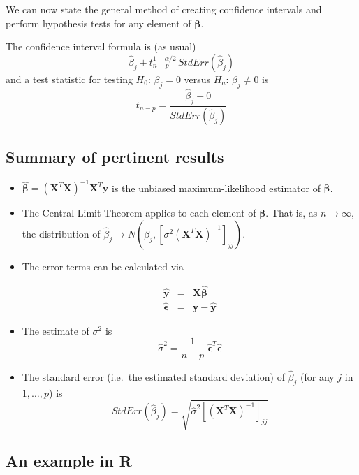 \documentclass[]{book}
\theoremstyle{definition}
\theoremstyle{definition}
\theoremstyle{remark}
\begin{document}
We can now state the general method of creating confidence intervals and
perform hypothesis tests for any element of \(\boldsymbol{\beta}\).

The confidence interval formula is (as usual) \[
\hat{\beta}_{j}\pm t_{n-p}^{1-\alpha/2}\,StdErr\left(\hat{\beta}_{j}\right)
\] and a test statistic for testing \(H_{0}:\,\beta_{j}=0\) versus
\(H_{a}:\,\beta_{j}\ne0\) is \[
t_{n-p}=\frac{\hat{\beta}_{j}-0}{StdErr\left(\hat{\beta}_{j}\right)}
\]

\subsection{Summary of pertinent
results}\label{summary-of-pertinent-results}

\begin{itemize}
\item
  \(\hat{\boldsymbol{\beta}}=\left(\boldsymbol{X}^{T}\boldsymbol{X}\right)^{-1}\boldsymbol{X}^{T}\boldsymbol{y}\)
  is the unbiased maximum-likelihood estimator of
  \(\boldsymbol{\beta}\).
\item
  The Central Limit Theorem applies to each element of
  \(\boldsymbol{\beta}\). That is, as \(n\to\infty\), the distribution
  of
  \(\hat{\beta}_{j}\to N\left(\beta_{j},\left[\sigma^{2}\left(\boldsymbol{X}^{T}\boldsymbol{X}\right)^{-1}\right]_{jj}\right)\).
\item
  The error terms can be calculated via

  \begin{eqnarray*}
  \hat{\boldsymbol{y}} & = & \boldsymbol{X}\hat{\boldsymbol{\beta}}\\
  \hat{\boldsymbol{\epsilon}} & = & \boldsymbol{y}-\hat{\boldsymbol{y}}
  \end{eqnarray*}
\item
  The estimate of \(\sigma^{2}\) is \[
  \hat{\sigma}^{2}=\frac{1}{n-p}\;\hat{\boldsymbol{\epsilon}}^{T}\hat{\boldsymbol{\epsilon}}
  \]
\item
  The standard error (i.e.~the estimated standard deviation) of
  \(\hat{\beta}_{j}\) (for any \(j\) in \(1,\dots,p\)) is \[
  StdErr\left(\hat{\beta}_{j}\right)=\sqrt{\hat{\sigma}^{2}\left[\left(\boldsymbol{X}^{T}\boldsymbol{X}\right)^{-1}\right]_{jj}}
  \]
\end{itemize}

\subsection{An example in R}\label{an-example-in-r}
\end{document}
